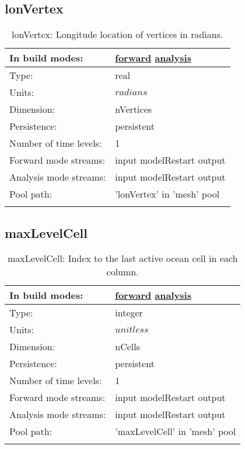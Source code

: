 \subsection[lonVertex]{lonVertex}
\label{subsec:var_sec_mesh_lonVertex}
\begin{center}
\begin{longtable}{| p{2.0in} | p{4.0in} |}
        \hline 
        In build modes: & \hyperref[subsec:forward_var_tab_mesh]{forward} \hyperref[subsec:analysis_var_tab_mesh]{analysis} \\
        \hline 
        Type: & real \\
        \hline 
        Units: & $radians$ \\
        \hline 
        Dimension: & nVertices \\
        \hline 
        Persistence: & persistent \\
        \hline 
        Number of time levels: & 1 \\
        \hline 
		 Forward mode streams: &  input modelRestart output \\
        \hline 
		 Analysis mode streams: &  input modelRestart output \\
        \hline 
            Pool path: & 'lonVertex' in 'mesh' pool
 \\
		 \hline 
    \caption{lonVertex: Longitude location of vertices in radians.}
\end{longtable}
\end{center}
\subsection[maxLevelCell]{maxLevelCell}
\label{subsec:var_sec_mesh_maxLevelCell}
\begin{center}
\begin{longtable}{| p{2.0in} | p{4.0in} |}
        \hline 
        In build modes: & \hyperref[subsec:forward_var_tab_mesh]{forward} \hyperref[subsec:analysis_var_tab_mesh]{analysis} \\
        \hline 
        Type: & integer \\
        \hline 
        Units: & $unitless$ \\
        \hline 
        Dimension: & nCells \\
        \hline 
        Persistence: & persistent \\
        \hline 
        Number of time levels: & 1 \\
        \hline 
		 Forward mode streams: &  input modelRestart output \\
        \hline 
		 Analysis mode streams: &  input modelRestart output \\
        \hline 
            Pool path: & 'maxLevelCell' in 'mesh' pool
 \\
		 \hline 
    \caption{maxLevelCell: Index to the last active ocean cell in each column.}
\end{longtable}
\end{center}
